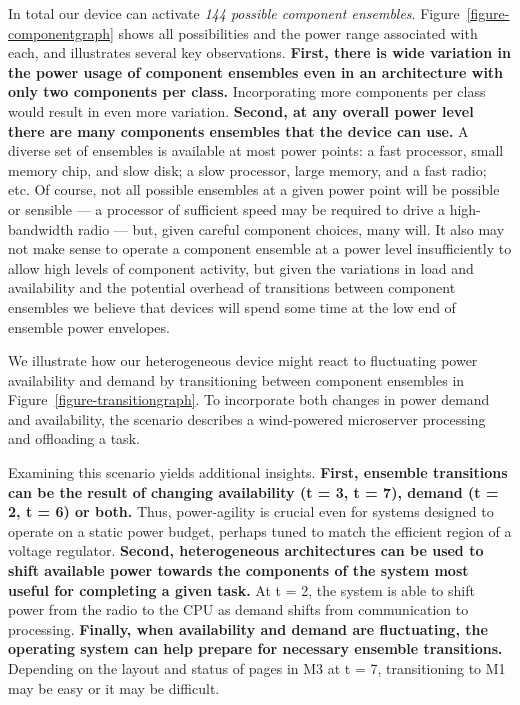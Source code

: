 In total our device can activate \textit{144 possible component ensembles}.
Figure~\ref{figure-componentgraph} shows all possibilities and the power
range associated with each, and illustrates several key observations.
\textbf{First, there is wide variation in the power usage of component
ensembles even in an architecture with only two components per class.}
Incorporating more components per class would result in even more variation.
\textbf{Second, at any overall power level there are many components
ensembles that the device can use.} A diverse set of ensembles is available
at most power points: a fast processor, small memory chip, and slow disk; a
slow processor, large memory, and a fast radio; etc. Of course, not all
possible ensembles at a given power point will be possible or sensible --- a
processor of sufficient speed may be required to drive a high-bandwidth radio
--- but, given careful component choices, many will. It also may not make
sense to operate a component ensemble at a power level insufficiently to
allow high levels of component activity, but given the variations in load and
availability and the potential overhead of transitions between component
ensembles we believe that devices will spend some time at the low end of
ensemble power envelopes.

We illustrate how our heterogeneous device might react to fluctuating power
availability and demand by transitioning between component ensembles in
Figure~\ref{figure-transitiongraph}. To incorporate both changes in power
demand and availability, the scenario describes a wind-powered microserver
processing and offloading a task.





Examining this scenario yields additional insights. \textbf{First, ensemble
transitions can be the result of changing availability (t = 3, t = 7), demand
(t = 2, t = 6) or both.} Thus, power-agility is crucial even for systems
designed to operate on a static power budget, perhaps tuned to match the
efficient region of a voltage regulator. \textbf{Second, heterogeneous
architectures can be used to shift available power towards the components of
the system most useful for completing a given task.} At t = 2, the system is
able to shift power from the radio to the CPU as demand shifts from
communication to processing. \textbf{Finally, when availability and demand
are fluctuating, the operating system can help prepare for necessary ensemble
transitions.} Depending on the layout and status of pages in M3 at t = 7,
transitioning to M1 may be easy or it may be difficult.

